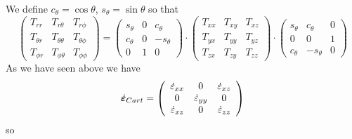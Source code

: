 We define $c_\theta=\cos\theta$, $s_\theta=\sin\theta$ so that
\[
\left(
\begin{array}{ccc}
T_{rr}       & T_{r\theta}      & T_{r\phi} \\
T_{\theta r} & T_{\theta\theta} & T_{\theta\phi} \\
T_{\phi r}   & T_{\phi \theta}  & T_{\phi\phi}
\end{array}
\right)
=
\left(
\begin{array}{ccc}
s_\theta  & 0 & c_\theta \\
c_\theta  & 0 & -s_\theta \\
0 & 1 & 0 
\end{array}
\right)
\cdot
\left(
\begin{array}{ccc}
T_{xx} & T_{xy} & T_{xz} \\
T_{yx} & T_{yy} & T_{yz} \\
T_{zx} & T_{zy} & T_{zz} 
\end{array}
\right)
\cdot
\left(
\begin{array}{ccc}
s_\theta & c_\theta & 0 \\
0 & 0 & 1 \\
c_\theta & -s_\theta & 0
\end{array}
\right)
\]
As we have seen above we have 
\[
\dot{\bm\varepsilon}_{\tiny Cart}
=
\left(
\begin{array}{ccc}
\dot\varepsilon_{xx} & 0 & \dot{\varepsilon}_{xz} \\
0 & \dot{\varepsilon}_{yy}  & 0 \\
\dot{\varepsilon}_{xz} & 0 & \dot\varepsilon_{zz}
\end{array}
\right)
\]
so 
